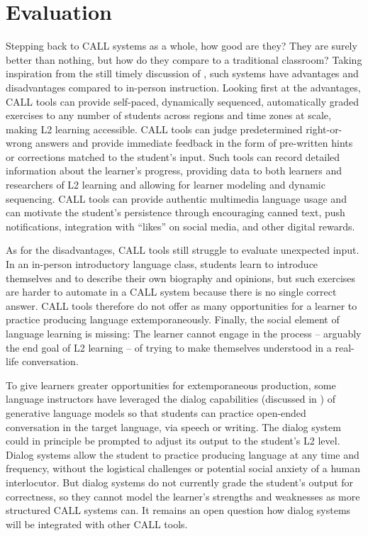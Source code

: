 \section{Evaluation}

Stepping back to CALL systems as a whole, how good are they? 
 They are surely better than nothing, but how do they compare to a traditional classroom? 
Taking inspiration from the still timely discussion of
\citet{Meskill:2002}, such systems have advantages and
disadvantages compared to in-person instruction.  Looking
first at the advantages, CALL tools can provide self-paced,
dynamically sequenced, automatically graded exercises to any number of
students across regions and time zones at scale, making L2 learning
accessible.  CALL tools can judge predetermined right-or-wrong answers
and provide immediate feedback in the form of
pre-written hints or corrections matched to the student's input.  Such
tools can record detailed information about the learner's progress,
providing data to both learners and researchers of L2 learning and
allowing for learner modeling and dynamic sequencing.  CALL tools can
provide authentic multimedia language usage and can motivate the
student's persistence through encouraging canned text, push
notifications, integration with ``likes'' on social media, and other
digital rewards.

As for the disadvantages, CALL tools still struggle to evaluate unexpected
input.  In an in-person introductory language class, students
learn to introduce themselves and to describe their own biography and
opinions, but such exercises are harder to automate in a CALL
system because there is no single correct answer.  CALL tools
therefore do not offer as many opportunities for a learner to practice
producing language extemporaneously.  Finally, the social element of
language learning is missing: The learner cannot engage in the process
-- arguably the end goal of L2 learning -- of trying to make
themselves understood in a real-life conversation.

To give learners greater opportunities for extemporaneous production, some language instructors have leveraged the dialog capabilities (discussed in ) of generative language models so that students can practice open-ended conversation in the target language, via speech or writing.  The dialog system could in principle be prompted to adjust its output to the student's L2 level.  Dialog systems allow the student to practice producing language at any time and frequency, without the logistical challenges or potential social anxiety of a human interlocutor.  But dialog systems do not currently grade the student's output for correctness, so they cannot model the learner's strengths and weaknesses as more structured CALL systems can.  It remains an open question how dialog systems will be integrated with other CALL tools.


